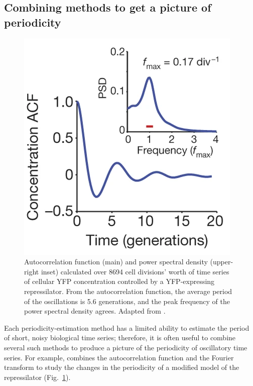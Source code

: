\subsection{Combining methods to get a picture of periodicity}
\label{subsec:analysis-characterisation-combined}

\begin{figure}
  \centering
  \includegraphics[width=0.5\linewidth]{potvin-trottierSynchronousLongtermOscillations2016_1e_adapted}
  \caption[
    Autocorrelation function and power spectral density calculated time series of cellular YFP concentration
  ]{
    Autocorrelation function (main) and power spectral density (upper-right inset) calculated over \num{8694} cell divisions' worth of time series of cellular YFP concentration controlled by a YFP-expressing repressilator.
    From the autocorrelation function, the average period of the oscillations is 5.6 generations, and the peak frequency of the power spectral density agrees.
    Adapted from \textcite{potvin-trottierSynchronousLongtermOscillations2016}.
  }
  \label{fig:acf-fft-example}
\end{figure}

Each periodicity-estimation method has a limited ability to estimate the period of short, noisy biological time series; therefore, it is often useful to combine several such methods to produce a picture of the periodicity of oscillatory time series.
For example, \textcite{potvin-trottierSynchronousLongtermOscillations2016} combines the autocorrelation function and the Fourier transform to study the changes in the periodicity of a modified model of the repressilator (Fig.\ \ref{fig:acf-fft-example}).

